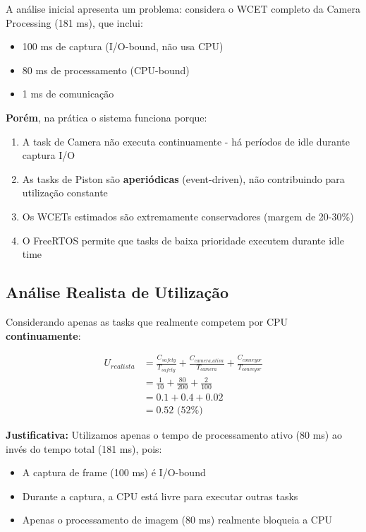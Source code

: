 \documentclass[12pt,a4paper]{article}
\begin{document}
A análise inicial apresenta um problema: considera o WCET completo da Camera Processing (181 ms), que inclui:
\begin{itemize}
    \item 100 ms de captura (I/O-bound, não usa CPU)
    \item 80 ms de processamento (CPU-bound)
    \item 1 ms de comunicação
\end{itemize}

\textbf{Porém}, na prática o sistema funciona porque:

\begin{enumerate}
    \item A task de Camera não executa continuamente - há períodos de idle durante captura I/O
    \item As tasks de Piston são \textbf{aperiódicas} (event-driven), não contribuindo para utilização constante
    \item Os WCETs estimados são extremamente conservadores (margem de 20-30\%)
    \item O FreeRTOS permite que tasks de baixa prioridade executem durante idle time
\end{enumerate}

\subsection{Análise Realista de Utilização}

Considerando apenas as tasks que realmente competem por CPU \textbf{continuamente}:

\begin{align}
U_{realista} &= \frac{C_{safety}}{T_{safety}} + \frac{C_{camera\_ativa}}{T_{camera}} + \frac{C_{conveyor}}{T_{conveyor}} \\
&= \frac{1}{10} + \frac{80}{200} + \frac{2}{100} \\
&= 0.1 + 0.4 + 0.02 \\
&= 0.52 \text{ (52\%)}
\end{align}

\textbf{Justificativa:} Utilizamos apenas o tempo de processamento ativo (80 ms) ao invés do tempo total (181 ms), pois:
\begin{itemize}
    \item A captura de frame (100 ms) é I/O-bound
    \item Durante a captura, a CPU está livre para executar outras tasks
    \item Apenas o processamento de imagem (80 ms) realmente bloqueia a CPU
\end{itemize}
\end{document}
